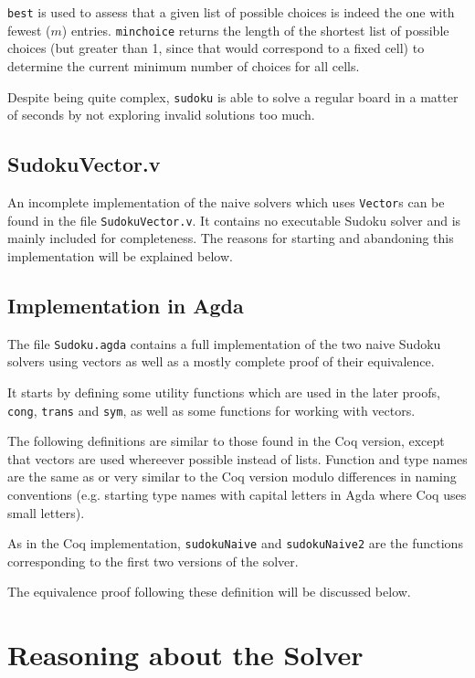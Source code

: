 \documentclass[a4paper,11pt]{article}
\begin{document}
\texttt{best} is used to assess that a given list of possible choices is indeed the one with fewest (\(m\)) entries. \texttt{minchoice} returns the length of the shortest list of possible choices (but greater than 1, since that would correspond to a fixed cell) to determine the current minimum number of choices for all cells.

Despite being quite complex, \texttt{sudoku} is able to solve a regular board in a matter of seconds by not exploring invalid solutions too much.

\subsection{SudokuVector.v}
An incomplete implementation of the naive solvers which uses \texttt{Vector}s can be found in the file \texttt{SudokuVector.v}. It contains no executable Sudoku solver and is mainly included for completeness. The reasons for starting and abandoning this implementation will be explained below.

\subsection{Implementation in Agda}
The file \texttt{Sudoku.agda} contains a full implementation of the two naive Sudoku solvers using vectors as well as a mostly complete proof of their equivalence.

It starts by defining some utility functions which are used in the later proofs, \texttt{cong}, \texttt{trans} and \texttt{sym}, as well as some functions for working with vectors.

The following definitions are similar to those found in the Coq version, except that vectors are used whereever possible instead of lists. Function and type names are the same as or very similar to the Coq version modulo differences in naming conventions (e.g. starting type names with capital letters in Agda where Coq uses small letters). 

As in the Coq implementation, \texttt{sudokuNaive} and \texttt{sudokuNaive2} are the functions corresponding to the first two versions of the solver.

The equivalence proof following these definition will be discussed below.

\section{Reasoning about the Solver}
\label{sec:reas}
\end{document}
